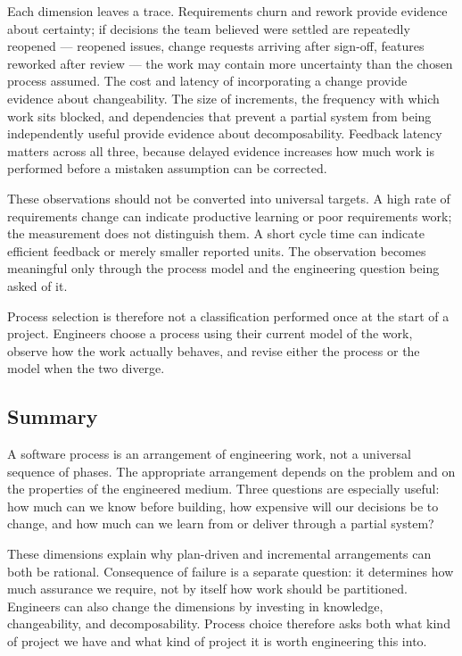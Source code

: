 Each dimension leaves a trace. Requirements churn and rework provide evidence about certainty; if
decisions the team believed were settled are repeatedly reopened --- reopened issues, change requests
arriving after sign-off, features reworked after review --- the work may contain more uncertainty than
the chosen process assumed. The cost and latency of incorporating a change provide evidence about
changeability. The size of increments, the frequency with which work sits blocked, and dependencies
that prevent a partial system from being independently useful provide evidence about decomposability.
Feedback latency matters across all three, because delayed evidence increases how much work is
performed before a mistaken assumption can be corrected.

These observations should not be converted into universal targets. A high rate of requirements change
can indicate productive learning or poor requirements work; the measurement does not distinguish
them. A short cycle time can indicate efficient feedback or merely smaller reported units. The
observation becomes meaningful only through the process model and the engineering question being
asked of it.

Process selection is therefore not a classification performed once at the start of a project.
Engineers choose a process using their current model of the work, observe how the work actually
behaves, and revise either the process or the model when the two diverge.

\subsection{Summary}\label{summary}

A software process is an arrangement of engineering work, not a universal sequence of phases. The
appropriate arrangement depends on the problem and on the properties of the engineered medium. Three
questions are especially useful: how much can we know before building, how expensive will our decisions be
to change, and how much can we learn from or deliver through a partial system?

These dimensions explain why plan-driven and incremental arrangements can both be rational. Consequence of
failure is a separate question: it determines how much assurance we require, not by itself how work should
be partitioned. Engineers can also change the dimensions by investing in knowledge, changeability, and
decomposability. Process choice therefore asks both what kind of project we have and what kind of project
it is worth engineering this into.


